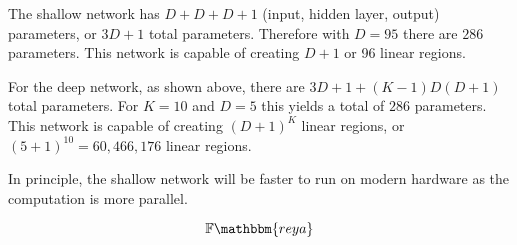 \documentclass[12pt]{report}
\begin{document}
The shallow network has $D + D + D + 1$ (input, hidden layer, output) parameters, or $3D + 1$ total parameters. Therefore with $D=95$ there are $286$ parameters. This network is capable of creating $D+1$ or 96 linear regions.

For the deep network, as shown above, there are $3D + 1 + (K-1)D(D+1)$ total parameters. For $K=10$ and $D=5$ this yields a total of $286$ parameters. This network is capable of creating $(D+1)^{K}$ linear regions, or $(5+1)^{10} = 60,466,176$ linear regions.

In principle, the shallow network will be faster to run on modern hardware as the computation is more parallel.







\begin{equation*}
    \mathbb{F}\mathbbm{reya}
\end{equation*}
\end{document}
